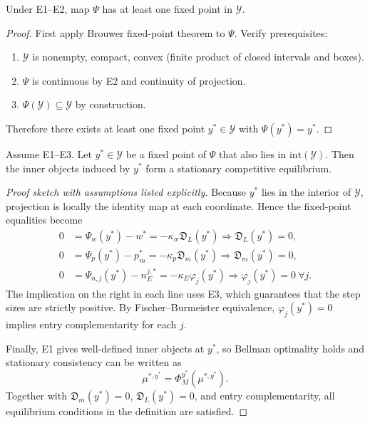 \begin{proposition}
Under E1--E2, map $\Psi$ has at least one fixed point in $\mathcal Y$.
\end{proposition}

\begin{proof}
First apply Brouwer fixed-point theorem to $\Psi$. Verify prerequisites:
\begin{enumerate}
    \item $\mathcal Y$ is nonempty, compact, convex (finite product of closed intervals and boxes).
    \item $\Psi$ is continuous by E2 and continuity of projection.
    \item $\Psi(\mathcal Y)\subseteq\mathcal Y$ by construction.
\end{enumerate}
\mbox{} Therefore there exists at least one fixed point $y^*\in\mathcal Y$ with $\Psi(y^*)=y^*$.
\end{proof}

\begin{proposition}
Assume E1--E3. Let $y^*\in\mathcal Y$ be a fixed point of $\Psi$ that also lies in $\mathrm{int}(\mathcal Y)$. Then the inner objects induced by $y^*$ form a stationary competitive equilibrium.
\end{proposition}

\begin{proof}[Proof sketch with assumptions listed explicitly]
Because $y^*$ lies in the interior of $\mathcal Y$, projection is locally the identity map at each coordinate. Hence the fixed-point equalities become
\begin{align*}
0&=\Psi_w(y^*)-w^*=-\kappa_w\mathfrak D_L(y^*)
\Rightarrow \mathfrak D_L(y^*)=0,\\
0&=\Psi_p(y^*)-p_m^*=-\kappa_p\mathfrak D_m(y^*)
\Rightarrow \mathfrak D_m(y^*)=0,\\
0&=\Psi_{n,j}(y^*)-n_E^{j,*}=-\kappa_E\varphi_j(y^*)
\Rightarrow \varphi_j(y^*)=0\ \forall j.
\end{align*}
The implication on the right in each line uses E3, which guarantees that the step sizes are strictly positive. By Fischer--Burmeister equivalence, $\varphi_j(y^*)=0$ implies entry complementarity for each $j$.

Finally, E1 gives well-defined inner objects at $y^*$, so Bellman optimality holds and stationary consistency can be written as
\[
\mu^{*,y^*}=\Phi_M^{y^*}(\mu^{*,y^*}).
\]
Together with $\mathfrak D_m(y^*)=0$, $\mathfrak D_L(y^*)=0$, and entry complementarity, all equilibrium conditions in the definition are satisfied.
\end{proof}

